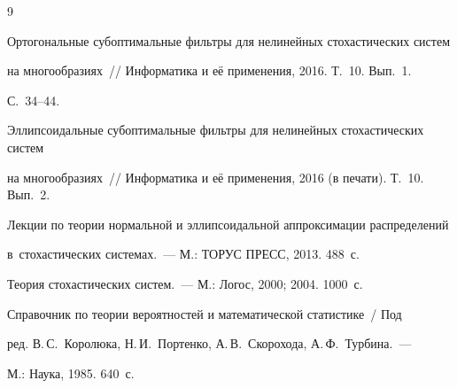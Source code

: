 {\small\frenchspacing

{%


\begin{thebibliography}{9}



Ортогональные субоптимальные фильтры для нелинейных стохастических систем 

на многообразиях~/\!\!/ Информатика и её применения, 2016. Т.~10. Вып.~1.

С.~34--44.







Эллипсоидальные субоптимальные фильтры для нелинейных стохастических систем 

на многообразиях~/\!\!/ Информатика и её применения, 2016 (в печати). Т.~10. Вып.~2.







Лекции по теории нормальной и эллипсоидальной аппроксимации распределений 

в~стохастических системах.~--- М.: ТОРУС ПРЕСС, 2013. 488~с.





Теория стохастических систем.~--- М.: Логос, 2000; 2004. 1000~с.






Справочник по теории вероятностей и математической статистике~/ Под

ред. В.\,С.~Королюка, Н.\,И.~Портенко, А.\,В.~Скорохода, А.\,Ф.~Турбина.~--- 

М.: Наука, 1985. 640~с.






\end{thebibliography}}}
